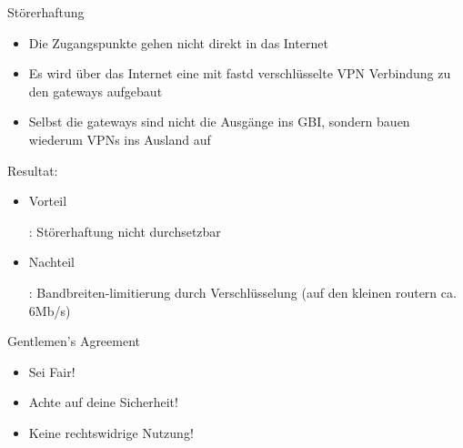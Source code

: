 \documentclass[c]{beamer}
\begin{document}
\begin{frame}{Störerhaftung}
	\begin{itemize}
		\item Die Zugangspunkte gehen nicht direkt in das Internet
		\item Es wird über das Internet eine mit fastd verschlüsselte VPN Verbindung zu den gateways aufgebaut
		\item Selbst die gateways sind nicht die Ausgänge ins GBI, sondern bauen wiederum VPNs ins Ausland auf
	\end{itemize}
	Resultat:
	\begin{itemize}
		\item \begin{it}Vorteil\end{it}: Störerhaftung nicht durchsetzbar
		\item \begin{it}Nachteil\end{it}: Bandbreiten-limitierung durch Verschlüsselung (auf den kleinen routern ca. 6Mb/s)
	\end{itemize}
\end{frame}



\begin{frame}{Gentlemen's Agreement}
	\begin{itemize}
		\item Sei Fair!
		\item Achte auf deine Sicherheit!
		\item Keine rechtswidrige Nutzung!
	\end{itemize}
\end{frame}
\end{document}
